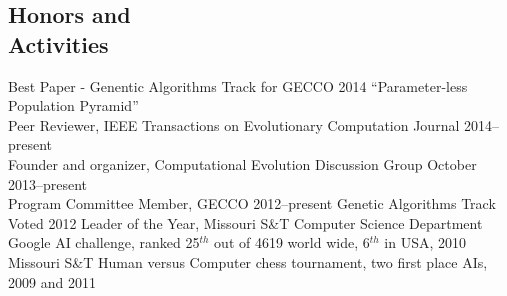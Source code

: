 \documentclass[margin,line]{resume}
\begin{document}
\begin{resume}
    \section{\mysidestyle Honors and\\Activities}
    Best Paper - Genentic Algorithms Track for GECCO 2014 ``Parameter-less Population Pyramid''\\%
    Peer Reviewer, IEEE Transactions on Evolutionary Computation Journal 2014--present\\%
    Founder and organizer, Computational Evolution Discussion Group October 2013--present\\%
    Program Committee Member, GECCO 2012--present Genetic Algorithms Track \vspace{1mm}\\%
    Voted 2012 Leader of the Year, Missouri S\&T Computer Science Department \vspace{1mm}\\%
    Google AI challenge, ranked 25$^{th}$ out of 4619 world wide, 6$^{th}$ in USA, 2010 \vspace{1mm}\\%
    Missouri S\&T Human versus Computer chess tournament, two first place AIs, 2009 and 2011 \vspace{1mm}\\%
\begin{comment}    
    ACM SIG-Game Competition testing and balancing using evolving AI, 2009--2012 \vspace{1mm}\\%
    ACM SIG-Game first place AI, 2008          \vspace{1mm}\\%
    University of Illinois at Urbana-Champaign MechMania AI competition second place AI, 2007  \vspace{1mm}\\%
    Missouri S\&T Alumni Scholarship 2006--2010             %

    \section{\mysidestyle Programming} 
    Python, C, C++, C\#, Matlab, Linux shell scripting, \LaTeX, Java, CUDA.


\end{comment}
\end{resume}
\end{document}

